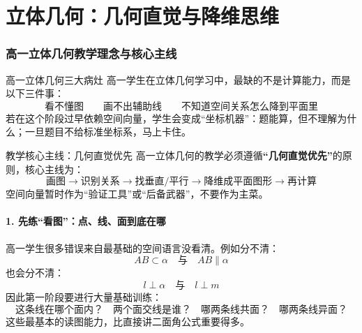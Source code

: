 \documentclass[11pt,a4paper]{ctexart}
\begin{document}
\endgroup




\newpage
\part{立体几何：几何直觉与降维思维}

\section{高一立体几何教学理念与核心主线}

\begin{teachbox}{高一立体几何三大病灶}
高一学生在立体几何学习中，最缺的不是计算能力，而是以下三件事：
\[
  \boxed{
  \text{看不懂图}
  \quad\quad
  \text{画不出辅助线}
  \quad\quad
  \text{不知道空间关系怎么降到平面里}
  }
\]
若在这个阶段过早依赖空间向量，学生会变成“坐标机器”：题能算，但不理解为什么；一旦题目不给标准坐标系，马上卡住。
\end{teachbox}

\begin{teachbox}{教学核心主线：几何直觉优先}
高一立体几何的教学必须遵循\textbf{“几何直觉优先”}的原则，核心主线为：
\[
  \boxed{
  \text{画图}
  \rightarrow
  \text{识别关系}
  \rightarrow
  \text{找垂直/平行}
  \rightarrow
  \text{降维成平面图形}
  \rightarrow
  \text{再计算}
  }
\]
空间向量暂时作为“验证工具”或“后备武器”，不要作为主菜。
\end{teachbox}

\subsection{1. 先练“看图”：点、线、面到底在哪}
高一学生很多错误来自最基础的空间语言没看清。例如分不清：
\[ AB\subset \alpha \quad \text{与} \quad AB\parallel \alpha \]
也会分不清：
\[ l\perp \alpha \quad \text{与} \quad l\perp m \]
因此第一阶段要进行大量基础训练：
\[
  \boxed{
  \text{这条线在哪个面内？} \quad
  \text{两个面交线是谁？} \quad
  \text{哪两条线共面？} \quad
  \text{哪两条线异面？}
  }
\]
这些最基本的读图能力，比直接讲二面角公式重要得多。
\end{document}
